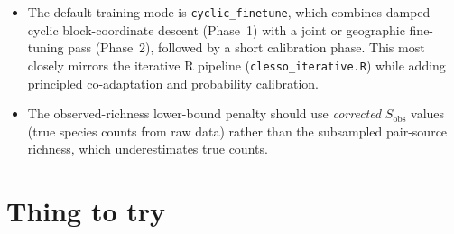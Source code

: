 \documentclass{article}
\begin{document}
\begin{itemize}
    \item The default training mode is \texttt{cyclic\_finetune}, which combines damped cyclic block-coordinate descent (Phase~1) with a joint or geographic fine-tuning pass (Phase~2), followed by a short calibration phase. This most closely mirrors the iterative R pipeline (\texttt{clesso\_iterative.R}) while adding principled co-adaptation and probability calibration.
    \item The observed-richness lower-bound penalty should use \textit{corrected} $S_{\text{obs}}$ values (true species counts from raw data) rather than the subsampled pair-source richness, which underestimates true counts.
\end{itemize}


\section{Thing to try}
\end{document}
